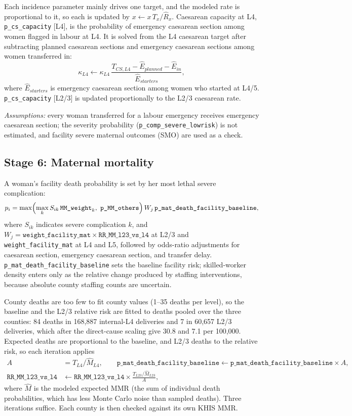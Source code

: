 \documentclass[11pt]{article}
\newcommand{\p}[1]{\texttt{#1}}
\begin{document}
Each incidence parameter mainly drives one target, and the modeled rate is
proportional to it, so each is updated by
$x\leftarrow x\,T_x/\widehat R_x$. Caesarean capacity at L4,
\p{p\_cs\_capacity} [L4], is the probability of emergency caesarean section
among women flagged in labour at L4. It is solved from the L4 caesarean target
after subtracting planned caesarean sections and emergency caesarean sections
among women transferred in:
\begin{equation}
\kappa_{L4}\leftarrow\kappa_{L4}\,
\frac{T_{CS,L4}-\widehat E_{planned}-\widehat E_{in}}{\widehat E_{starters}},
\end{equation}
where $\widehat E_{starters}$ is emergency caesarean section among women who
started at L4/5. \p{p\_cs\_capacity} [L2/3] is updated proportionally to the
L2/3 caesarean rate.

\emph{Assumptions:} every woman transferred for a labour emergency receives
emergency caesarean section; the severity probability
(\p{p\_comp\_severe\_lowrisk}) is not estimated, and facility severe maternal
outcomes (SMO) are used as a check.

\subsection{Stage 6: Maternal mortality}

A woman's facility death probability is set by her most lethal severe
complication:
\begin{equation}
p_{i}=\max\Bigl(\max_k S_{ik}\,\p{MM\_weight}_k,\ \p{p\_MM\_others}\Bigr)
\,W_j\,\p{p\_mat\_death\_facility\_baseline},
\end{equation}
where $S_{ik}$ indicates severe complication $k$, and
$W_j=\p{weight\_facility\_mat}\times\p{RR\_MM\_l23\_vs\_l4}$ at L2/3 and
\p{weight\_facility\_mat} at L4 and L5, followed by odds-ratio adjustments for
caesarean section, emergency caesarean section, and transfer delay.
\p{p\_mat\_death\_facility\_baseline} sets the baseline facility risk; skilled-worker
density enters only as the relative change produced by staffing
interventions, because absolute county staffing counts are uncertain.

County deaths are too few to fit county values (1--35 deaths per level), so the
baseline and the L2/3 relative risk are fitted to deaths pooled over the three
counties: 84 deaths in 168,887 internal-L4 deliveries and 7 in 60,657 L2/3
deliveries, which after the direct-cause scaling give 30.8 and 7.1 per 100,000.
Expected deaths are proportional to the baseline, and L2/3 deaths to the
relative risk, so each iteration applies
\begin{align}
A&=T_{L4}/\widehat M_{L4},\qquad
\p{p\_mat\_death\_facility\_baseline}\leftarrow\p{p\_mat\_death\_facility\_baseline}\times A,\\
\p{RR\_MM\_l23\_vs\_l4}&\leftarrow\p{RR\_MM\_l23\_vs\_l4}\times\frac{T_{L23}/\widehat M_{L23}}{A},
\end{align}
where $\widehat M$ is the modeled expected MMR (the sum of individual death
probabilities, which has less Monte Carlo noise than sampled deaths). Three
iterations suffice. Each county is then checked against its own KHIS MMR.
\end{document}
